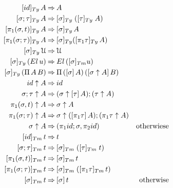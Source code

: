 \documentclass[a4paper,UKenglish,numberwithinsect,cleveref,thm-restate]{lipics-v2021}
\begin{document}
\begin{alignat*}{5}
[ \idS ]_{\Ty}\,A             & \reduce A \\
[ \sigma ; \tau ]_{\Ty}\,A    & \reduce [ \sigma ]_{\Ty}\;([ \tau ]_{\Ty}\;A) \\
[ \pi_1(\sigma, t) ]_{\Ty}\,A & \reduce [\sigma]_\Ty\,A \\
[ \pi_1(\sigma; \tau) ]_{\Ty}\,A & \reduce [\sigma]_\Ty ([\pi_1\tau]_\Ty \,A) \\
[ \sigma ]_{\Ty}\,\UU           & \reduce \UU \\
[ \sigma ]_{\Ty}\,(\El\, u) & \reduce \El\,([\sigma]_{\Tm}{u}) \\
[ \sigma ]_{\Ty}\,(\Pi\,A\,B) & \reduce \Pi\,(\sub{\sigma}{A})\,(\sub{\sigma\uparrow A}{B}) \\
\idS                \uparrow A & \reduce \idS \\
\sigma ; \tau       \uparrow A & \reduce (\sigma \uparrow \sub{\tau}{A} ) ; (\tau \uparrow A) \\
\pi_1(\sigma, t)    \uparrow A & \reduce \sigma \uparrow A \\
\pi_1(\sigma; \tau) \uparrow A & \reduce \sigma \uparrow (\sub{\pi_1 \tau}{A}) ; (\pi_1 \tau \uparrow A) \\
\sigma              \uparrow A & \reduce (\pi_1 \idS ; \sigma , \pi_2 \idS) & \text{otherwiese} \\
 [ \idS ]_{\Tm}\,t                & \reduce t \\
 [ \sigma ; \tau ]_{\Tm}\,t       & \reduce [ \sigma ]_{\Tm}\;([ \tau ]_{\Tm}\;t) \\
 [ \pi_1(\sigma, t) ]_{\Tm}\,t    & \reduce [\sigma]_\Tm\,t \\
 [ \pi_1(\sigma; \tau) ]_{\Tm}\,t & \reduce [\sigma]_\Tm\; ([\pi_1\tau]_\Tm \,t) \\
 [ \sigma ]_{\Tm}\,t              & \reduce [ \sigma ]\,t & \text{otherwise}
\end{alignat*}
\end{document}
